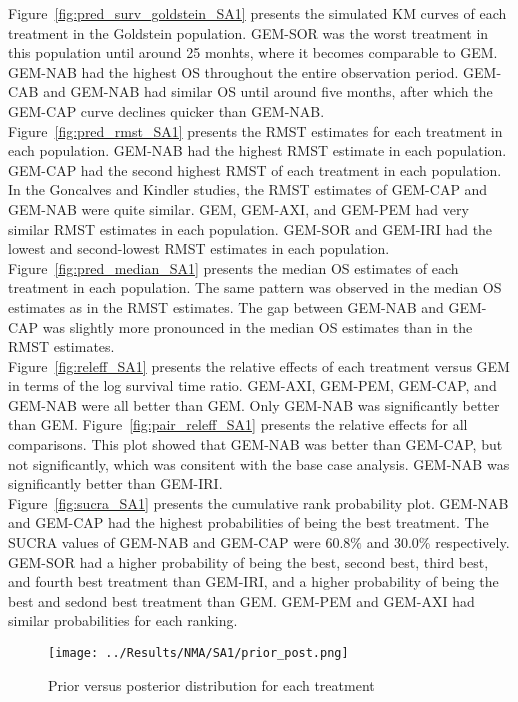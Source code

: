 Figure~\ref{fig:pred_surv_goldstein_SA1} presents the simulated KM curves of each treatment in the Goldstein population. GEM-SOR was the worst treatment in this population until around 25 monhts, where it becomes comparable to GEM. GEM-NAB had the highest OS throughout the entire observation period. GEM-CAB and GEM-NAB had similar OS until around five months, after which the GEM-CAP curve declines quicker than GEM-NAB. \\

Figure~\ref{fig:pred_rmst_SA1} presents the RMST estimates for each treatment in each population. GEM-NAB had the highest RMST estimate in each population. GEM-CAP had the second highest RMST of each treatment in each population. In the Goncalves and Kindler studies, the RMST estimates of GEM-CAP and GEM-NAB were quite similar. GEM, GEM-AXI, and GEM-PEM had very similar RMST estimates in each population. GEM-SOR and GEM-IRI had the lowest and second-lowest RMST estimates in each population. Figure~\ref{fig:pred_median_SA1} presents the median OS estimates of each treatment in each population. The same pattern was observed in the median OS estimates as in the RMST estimates. The gap between GEM-NAB and GEM-CAP was slightly more pronounced in the median OS estimates than in the RMST estimates. \\

Figure~\ref{fig:releff_SA1} presents the relative effects of each treatment versus GEM in terms of the log survival time ratio. GEM-AXI, GEM-PEM, GEM-CAP, and GEM-NAB were all better than GEM. Only GEM-NAB was significantly better than GEM. Figure~\ref{fig:pair_releff_SA1} presents the relative effects for all comparisons. This plot showed that GEM-NAB was better than GEM-CAP, but not significantly, which was consitent with the base case analysis. GEM-NAB was significantly better than GEM-IRI. \\

Figure~\ref{fig:sucra_SA1} presents the cumulative rank probability plot. GEM-NAB and GEM-CAP had the highest probabilities of being the best treatment. The SUCRA values of GEM-NAB and GEM-CAP were $60.8\%$ and $30.0\%$ respectively. GEM-SOR had a higher probability of being the best, second best, third best, and fourth best treatment than GEM-IRI, and a higher probability of being the best and sedond best treatment than GEM. GEM-PEM and GEM-AXI had similar probabilities for each ranking.

\begin{figure}[h]
    \centering
    \texttt{[image: ../Results/NMA/SA1/prior\_post.png]}
    \caption{Prior versus posterior distribution for each treatment}
    \label{fig:prior_post_SA1}
\end{figure}

